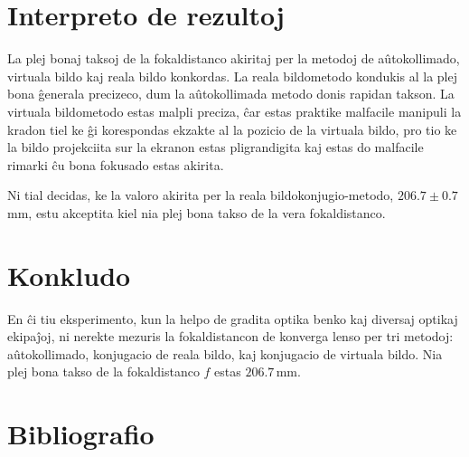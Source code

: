\documentclass[a4paper,11pt]{article}
\begin{document}
\section{Interpreto de rezultoj}

La plej bonaj taksoj de la fokaldistanco akiritaj per la metodoj de a\^{u}tokollimado, virtuala bildo kaj reala bildo konkordas. La reala bildometodo kondukis al la plej bona \^{g}enerala precizeco, dum la a\^{u}tokollimada metodo donis rapidan takson. La virtuala bildometodo estas malpli preciza, \^{c}ar estas praktike malfacile manipuli la kradon tiel ke \^{g}i korespondas ekzakte al la pozicio de la virtuala bildo, pro tio ke la bildo projekciita sur la ekranon estas pligrandigita kaj estas do malfacile rimarki \^{c}u bona fokusado estas akirita.

Ni tial decidas, ke la valoro akirita per la reala bildokonjugio-metodo, $206.7 \pm 0.7$\,mm, estu akceptita kiel nia plej bona takso de la vera fokaldistanco.

\section{Konkludo}

En \^{c}i tiu eksperimento, kun la helpo de gradita optika benko kaj diversaj optikaj ekipa\^{j}oj, ni nerekte mezuris la fokaldistancon de konverga lenso per tri metodoj: a\^{u}tokollimado, konjugacio de reala bildo, kaj konjugacio de virtuala bildo. Nia plej bona takso de la fokaldistanco $f$ estas $206.7$\,mm.

\section*{Bibliografio}
\end{document}
